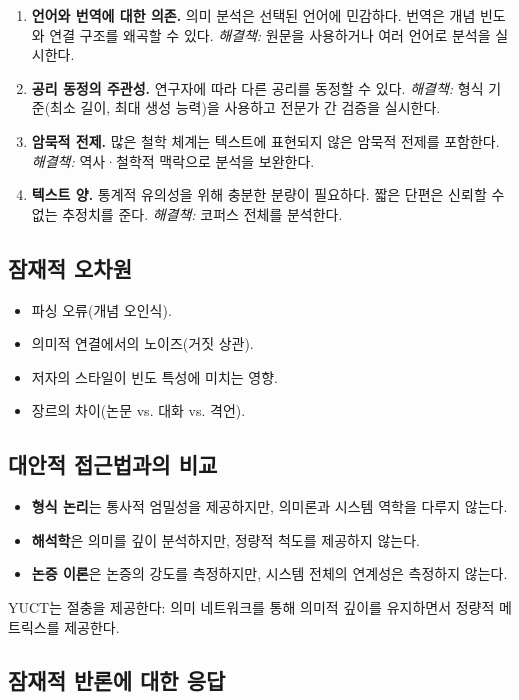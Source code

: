 \documentclass[11pt,a4paper]{article}
\begin{document}
	\begin{enumerate}
		\item \textbf{언어와 번역에 대한 의존.} 의미 분석은 선택된 언어에 민감하다. 번역은 개념 빈도와 연결 구조를 왜곡할 수 있다. \textit{해결책:} 원문을 사용하거나 여러 언어로 분석을 실시한다.
		\item \textbf{공리 동정의 주관성.} 연구자에 따라 다른 공리를 동정할 수 있다. \textit{해결책:} 형식 기준(최소 길이, 최대 생성 능력)을 사용하고 전문가 간 검증을 실시한다.
		\item \textbf{암묵적 전제.} 많은 철학 체계는 텍스트에 표현되지 않은 암묵적 전제를 포함한다. \textit{해결책:} 역사·철학적 맥락으로 분석을 보완한다.
		\item \textbf{텍스트 양.} 통계적 유의성을 위해 충분한 분량이 필요하다. 짧은 단편은 신뢰할 수 없는 추정치를 준다. \textit{해결책:} 코퍼스 전체를 분석한다.
	\end{enumerate}
	
	\subsection{잠재적 오차원}
	
	\begin{itemize}
		\item 파싱 오류(개념 오인식).
		\item 의미적 연결에서의 노이즈(거짓 상관).
		\item 저자의 스타일이 빈도 특성에 미치는 영향.
		\item 장르의 차이(논문 vs. 대화 vs. 격언).
	\end{itemize}
	
	\subsection{대안적 접근법과의 비교}
	
	\begin{itemize}
		\item \textbf{형식 논리}는 통사적 엄밀성을 제공하지만, 의미론과 시스템 역학을 다루지 않는다.
		\item \textbf{해석학}은 의미를 깊이 분석하지만, 정량적 척도를 제공하지 않는다.
		\item \textbf{논증 이론}은 논증의 강도를 측정하지만, 시스템 전체의 연계성은 측정하지 않는다.
	\end{itemize}
	YUCT는 절충을 제공한다: 의미 네트워크를 통해 의미적 깊이를 유지하면서 정량적 메트릭스를 제공한다.
	
	\subsection{잠재적 반론에 대한 응답}
	
\end{document}
